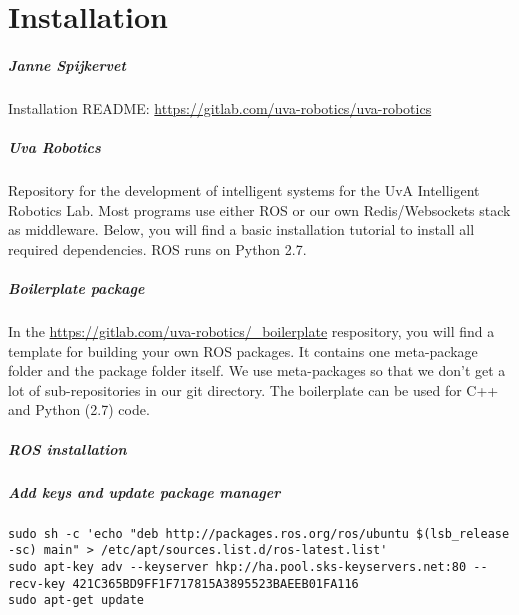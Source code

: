 
\chapter{Installation}
\paragraph{Janne Spijkervet}

Installation README: \url{https://gitlab.com/uva-robotics/uva-robotics}

\paragraph{Uva Robotics}\label{uva-robotics}
Repository for the development of intelligent systems for the UvA Intelligent Robotics Lab. Most programs use either ROS or our own Redis/Websockets stack as middleware. Below, you will find a basic installation tutorial to install all required dependencies. ROS runs on Python 2.7.

\paragraph{Boilerplate package}\label{boilerplate-package}

In the \url{https://gitlab.com/uva-robotics/\_boilerplate} respository, you will find a template for building your own ROS packages. It contains one meta-package folder and the package folder itself. We use meta-packages so that we don't get a lot of sub-repositories in our git directory. The boilerplate can be used for C++ and Python (2.7) code.

\paragraph{ROS installation}\label{ros-installation}

\paragraph{Add keys and update package manager}

\begin{verbatim}
sudo sh -c 'echo "deb http://packages.ros.org/ros/ubuntu $(lsb_release -sc) main" > /etc/apt/sources.list.d/ros-latest.list'
sudo apt-key adv --keyserver hkp://ha.pool.sks-keyservers.net:80 --recv-key 421C365BD9FF1F717815A3895523BAEEB01FA116
sudo apt-get update
\end{verbatim}

